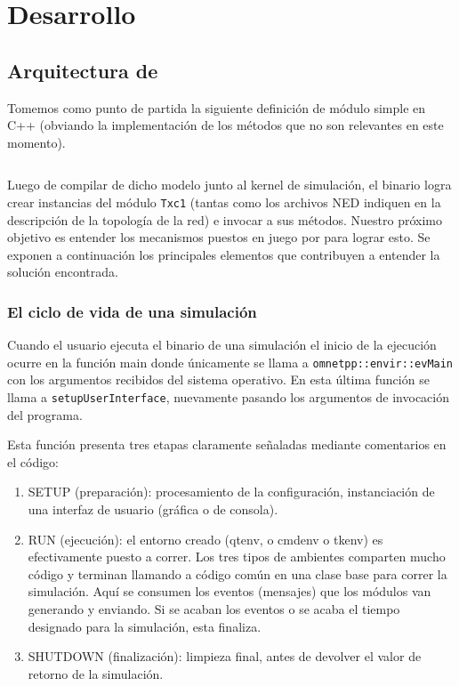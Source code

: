 \chapter{Desarrollo}\label{sec:des}
\section{Arquitectura de \omnetpp{}}

Tomemos como punto de partida la siguiente definición de módulo simple en C++
(obviando la implementación de los métodos que no son relevantes en este
momento).

\inputminted{c++}{codelistings/txc1.cc}

Luego de compilar de dicho modelo junto al kernel de simulación, el binario
logra crear instancias del módulo \verb!Txc1! (tantas como los archivos NED
indiquen en la descripción de la topología de la red) e invocar a sus métodos.
Nuestro próximo objetivo es entender los mecanismos puestos en juego por
\omnetpp{} para lograr esto. Se exponen a continuación los principales elementos
que contribuyen a entender la solución encontrada.

\subsection{El ciclo de vida de una simulación}

Cuando el usuario ejecuta el binario de una simulación el inicio de la
ejecución ocurre en la función main donde únicamente se llama a
\verb!omnetpp::envir::evMain! con los argumentos recibidos del sistema
operativo. En esta última función se llama a \verb!setupUserInterface!,
nuevamente pasando los argumentos de invocación del programa.

Esta función presenta tres etapas claramente señaladas mediante comentarios en
el código:

\begin{enumerate}
    \item SETUP (preparación): procesamiento de la configuración, instanciación
de una interfaz de usuario (gráfica o de consola).

    \item RUN (ejecución): el entorno creado (qtenv, o cmdenv o tkenv) es
efectivamente puesto a correr. Los tres tipos de ambientes comparten mucho
código y terminan llamando a código común en una clase base para correr la
simulación. Aquí se consumen los eventos (mensajes) que los módulos van
generando y enviando. Si se acaban los eventos o se acaba el tiempo designado
para la simulación, esta finaliza.

    \item SHUTDOWN (finalización): limpieza final, antes de devolver el valor
de retorno de la simulación.
\end{enumerate}

